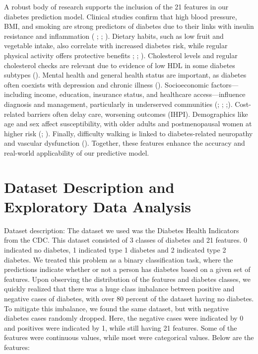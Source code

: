\documentclass[conference]{IEEEtran}
\begin{document}
A robust body of research supports the inclusion of the 21 features in our diabetes prediction model. Clinical studies confirm that high blood pressure, BMI, and smoking are strong predictors of diabetes due to their links with insulin resistance and inflammation ( \cite{lambert2021hypertension}; \cite{yashi2023obesity}; \cite{li2014fruitveg}). Dietary habits, such as low fruit and vegetable intake, also correlate with increased diabetes risk, while regular physical activity offers protective benefits \cite{sun2013fruit}; \cite{song2008fruit}; \cite{williams2008exercise}). Cholesterol levels and regular cholesterol checks are relevant due to evidence of low HDL in some diabetes subtypes (\cite{kennedy1978hdl}). Mental health and general health status are important, as diabetes often coexists with depression and chronic illness (\cite{gornik2010hyperglycaemia}). Socioeconomic factors—including income, education, insurance status, and healthcare access—influence diagnosis and management, particularly in underserved communities (\cite{zhu2012insurance}; \cite{patzer2021access}; \cite{lysy2013income};\cite{choi2024education}). Cost-related barriers often delay care, worsening outcomes (IHPI). Demographics like age and sex affect susceptibility, with older adults and postmenopausal women at higher risk (\cite{moore2003age}; \cite{gale2001rise}). Finally, difficulty walking is linked to diabetes-related neuropathy and vascular dysfunction (\cite{brach2008gait}). Together, these features enhance the accuracy and real-world applicability of our predictive model.

\section{Dataset Description and Exploratory Data Analysis}
Dataset description:
The dataset we used was the Diabetes Health Indicators from the CDC.  This dataset consisted of 3 classes of diabetes and 21 features.  0 indicated no diabetes, 1 indicated type 1 diabetes and 2 indicated type 2 diabetes.  We treated this problem as a binary classification task, where the predictions indicate whether or not a person has diabetes based on a given set of features.  Upon observing the distribution of the features and diabetes classes, we quickly realized that there was a huge class imbalance between positive and negative cases of diabetes, with over 80 percent of the dataset having no diabetes. \\ 
To mitigate this imbalance, we found the same dataset, but with negative diabetes cases randomly dropped.  Here, the negative cases were indicated by 0 and positives were indicated by 1, while still having 21 features.  Some of the features were continuous values, while most were categorical values.  Below are the features:\\
\end{document}
